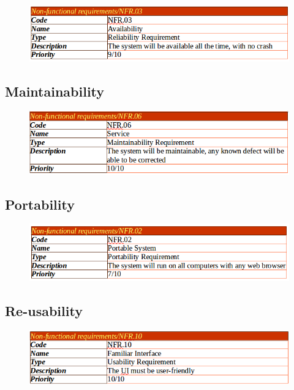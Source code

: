 \documentclass[]{article}
\begin{document}
\begin{figure}[H]
\centering
\includegraphics[scale=0.4]{./nonf/03}
\end{figure}

\subsection {Maintainability}

\begin{figure}[H]
\centering
\includegraphics[scale=0.4]{./nonf/04}
\end{figure}

\subsection {Portability}

\begin{figure}[H]
\centering
\includegraphics[scale=0.4]{./nonf/05}
\end{figure}

\subsection {Re-usability}

\begin{figure}[H]
\centering
\includegraphics[scale=0.4]{./nonf/06}
\end{figure}
\end{document}
